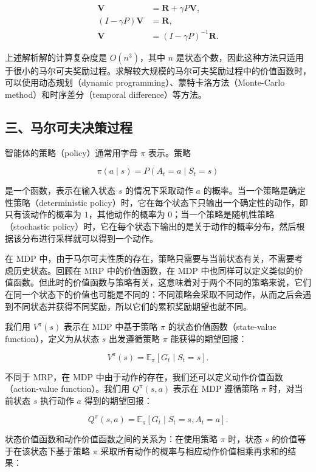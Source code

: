 \[
\begin{aligned}
\mathbf{V}&=\mathbf{R}+\gamma P\mathbf{V},\\
(I-\gamma P)\mathbf{V}&=\mathbf{R},\\
\mathbf{V}&=(I-\gamma P)^{-1}\mathbf{R}.
\end{aligned}
\]

上述解析解的计算复杂度是 \(O(n^{3})\)，其中 \(n\) 是状态个数，因此这种方法只适用于很小的马尔可夫奖励过程。求解较大规模的马尔可夫奖励过程中的价值函数时，可以使用动态规划（dynamic programming）、蒙特卡洛方法（Monte-Carlo method）和时序差分（temporal difference）等方法。

\hypertarget{ux4e09ux9a6cux5c14ux53efux592bux51b3ux7b56ux8fc7ux7a0b}{%
\subsection{三、马尔可夫决策过程}\label{ux4e09ux9a6cux5c14ux53efux592bux51b3ux7b56ux8fc7ux7a0b}}

智能体的策略（policy）通常用字母 \(\pi\) 表示。策略

\[
\pi(a\mid s)=P(A_t=a\mid S_t=s)
\]

是一个函数，表示在输入状态 \(s\) 的情况下采取动作 \(a\) 的概率。当一个策略是确定性策略（deterministic policy）时，它在每个状态下只输出一个确定性的动作，即只有该动作的概率为 \(1\)，其他动作的概率为 \(0\)；当一个策略是随机性策略（stochastic policy）时，它在每个状态下输出的是关于动作的概率分布，然后根据该分布进行采样就可以得到一个动作。

在 MDP 中，由于马尔可夫性质的存在，策略只需要与当前状态有关，不需要考虑历史状态。回顾在 MRP 中的价值函数，在 MDP 中也同样可以定义类似的价值函数。但此时的价值函数与策略有关，这意味着对于两个不同的策略来说，它们在同一个状态下的价值也可能是不同的：不同策略会采取不同动作，从而之后会遇到不同状态并获得不同奖励，所以它们的累积奖励期望也就不同。

我们用 \(V^{\pi}(s)\) 表示在 MDP 中基于策略 \(\pi\) 的状态价值函数（state-value function），定义为从状态 \(s\) 出发遵循策略 \(\pi\) 能获得的期望回报：

\[
V^{\pi}(s)=\mathbb{E}_{\pi}[G_t\mid S_t=s].
\]

不同于 MRP，在 MDP 中由于动作的存在，我们还可以定义动作价值函数（action-value function）。我们用 \(Q^{\pi}(s,a)\) 表示在 MDP 遵循策略 \(\pi\) 时，对当前状态 \(s\) 执行动作 \(a\) 得到的期望回报：

\[
Q^{\pi}(s,a)=\mathbb{E}_{\pi}[G_t\mid S_t=s,A_t=a].
\]

状态价值函数和动作价值函数之间的关系为：在使用策略 \(\pi\) 时，状态 \(s\) 的价值等于在该状态下基于策略 \(\pi\) 采取所有动作的概率与相应动作价值相乘再求和的结果：

